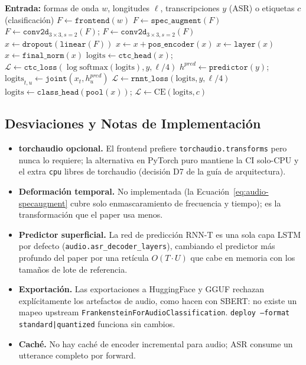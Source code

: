 \begin{algorithmic}[1]
\State \textbf{Entrada:} formas de onda $w$, longitudes $\ell$, transcripciones $y$ (ASR) o etiquetas $c$ (clasificación)
\State $F \gets \texttt{frontend}(w)$ 
\State $F \gets \texttt{spec\_augment}(F)$ 
\State $F \gets \texttt{conv2d}_{3\times3, s=2}(F)$; \quad $F \gets \texttt{conv2d}_{3\times3, s=2}(F)$
\State $x \gets \texttt{dropout}(\texttt{linear}(F))$ 
\State $x \gets x + \texttt{pos\_encoder}(x)$ 
    \State $x \gets \texttt{layer}(x)$ 
\EndFor
\State $x \gets \texttt{final\_norm}(x)$
    \State $\mathrm{logits} \gets \texttt{ctc\_head}(x)$; \quad $\mathcal{L} \gets \texttt{ctc\_loss}(\log\mathrm{softmax}(\mathrm{logits}), y, \ell/4)$
    \State $h^{pred} \gets \texttt{predictor}(y)$; \quad $\mathrm{logits}_{t,u} \gets \texttt{joint}(x_t, h^{pred}_u)$
    \State $\mathcal{L} \gets \texttt{rnnt\_loss}(\mathrm{logits}, y, \ell/4)$
\Else
    \State $\mathrm{logits} \gets \texttt{class\_head}(\texttt{pool}(x))$; \quad $\mathcal{L} \gets \mathrm{CE}(\mathrm{logits}, c)$
\EndIf
\end{algorithmic}

\subsection{Desviaciones y Notas de Implementación}

\begin{itemize}[leftmargin=*]
    \item \textbf{torchaudio opcional.} El frontend prefiere \texttt{torchaudio.transforms} pero nunca lo requiere; la alternativa en PyTorch puro mantiene la CI solo-CPU y el extra \texttt{cpu} libres de torchaudio (decisión D7 de la guía de arquitectura).
    \item \textbf{Deformación temporal.} No implementada (la Ecuación~\ref{eq:audio-specaugment} cubre solo enmascaramiento de frecuencia y tiempo); es la transformación que el paper usa menos.
    \item \textbf{Predictor superficial.} La red de predicción RNN-T es una sola capa LSTM por defecto (\texttt{audio.asr\_decoder\_layers}), cambiando el predictor más profundo del paper por una retícula $O(T \cdot U)$ que cabe en memoria con los tamaños de lote de referencia.
    \item \textbf{Exportación.} Las exportaciones a HuggingFace y GGUF rechazan explícitamente los artefactos de audio, como hacen con SBERT: no existe un mapeo upstream \texttt{FrankensteinForAudioClassification}. \texttt{deploy --format standard|quantized} funciona sin cambios.
    \item \textbf{Caché.} No hay caché de encoder incremental para audio; ASR consume un utterance completo por forward.
\end{itemize}
